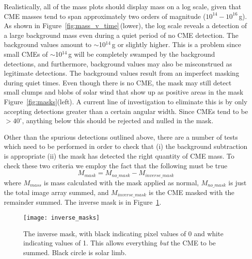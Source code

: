 Realistically, all of the mass plots should display mass on a log scale, given that CME masses tend to span approximately two orders of magnitude ($10^{14}-10^{16}$\,g). As shown in Figure~\ref{fig:mass_v_time}\,(lower), the log scale reveals a detection of a large background mass even during a quiet period of no CME detection. The background values amount to $\sim$10$^{14}$\,g or slightly higher. This is a problem since small CMEs of $\sim$10$^{14}$\,g will be completely swamped by the background detections, and furthermore, background values may also be misconstrued as legitimate detections. The background values result from an imperfect masking during quiet times. Even though there is no CME, the mask may still detect small clumps and blobs of solar wind that show up as positive areas in the mask Figure~\ref{fig:masks}(left). A current line of investigation to eliminate this is by only accepting detections greater than a certain angular width. Since CMEs tend to be $>40^{\circ}$, anything below this should be rejected and nulled in the mask.
%
%

%
%
%
%

Other than the spurious detections outlined above, there are a number of tests which need to be performed in order to check that (i) the background subtraction is appropriate (ii) the mask has detected the right quantity of CME mass. 
%
To check these two criteria we employ the fact that the following must be true
\begin{equation}
M_{mask} = M_{no\_mask} - M_{inverse\_mask}
\end{equation}
where $M_{mass}$ is mass calculated with the mask applied as normal, $M_{no\_mask}$ is just the total image array summed, and $M_{inverse\_mask}$ is the CME masked with the remainder summed. The inverse mask is in Figure~\ref{fig:inverse_masks}. 
\begin{figure}[t!]
\begin{center}
\texttt{[image: inverse\_masks]}
\caption[Inverse masks]{The inverse mask, with black indicating pixel values of 0 and white indicating values of 1. This allows everything \emph{but} the CME to be summed. Black circle is solar limb.}
\label{fig:inverse_masks}
\end{center}
\end{figure}

